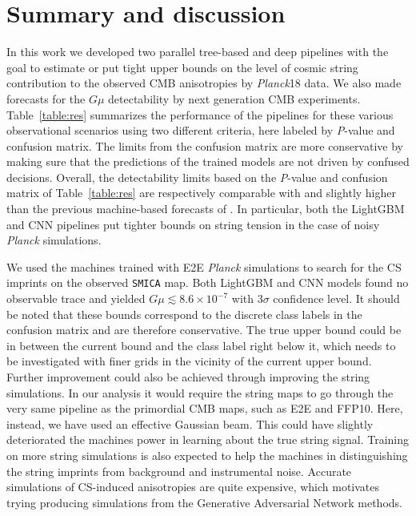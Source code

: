 \documentclass[fleqn,usenatbib]{mnras}
\begin{document}
 \section{Summary and discussion}\label{sec:sum}
In this work we developed two parallel tree-based and deep pipelines with the goal to estimate or put tight upper bounds on the level of cosmic string contribution
to the observed CMB anisotropies by {\it Planck}18 data. We also made forecasts for the $G\mu$ detectability by next generation CMB experiments.  
Table~\ref{table:res} summarizes the performance of the pipelines  for these various observational scenarios using two different criteria, here labeled by {\it P}-value and confusion matrix. 
The limits from the confusion matrix are more conservative by making sure that the predictions of the trained models are not driven  by confused decisions. 
Overall, the detectability limits based on the {\it P}-value and confusion matrix of Table~\ref{table:res} are respectively comparable with and slightly higher than the previous machine-based forecasts of \cite{vaf18}. In particular, both the LightGBM and CNN pipelines put tighter bounds on string tension in the case of noisy {\it Planck} simulations. 
%

We used the machines trained with E2E {\it Planck} simulations to search for the CS imprints on the observed \texttt{SMICA} map. Both LightGBM and CNN models found no observable trace  and yielded $G\mu \lesssim 8.6 \times 10^{-7}$  with $3\sigma$ confidence level.
It should be noted that these bounds correspond to the discrete class labels in the confusion matrix and are therefore conservative. The true upper bound could be in between the current bound and the class label right below it, which needs to be  investigated with finer grids in the vicinity of the current upper bound. 
Further improvement could also be achieved through improving the string simulations. In our analysis it would require the string maps to go  through the very same pipeline as the primordial CMB maps, such as E2E and FFP10. 
Here, instead, we have  used  an effective Gaussian beam.  This could have slightly deteriorated the machines power in learning about the true string signal.
Training on more string simulations is also expected to help the machines in distinguishing the string imprints from background and instrumental noise. Accurate simulations of CS-induced anisotropies are quite expensive, which motivates trying producing simulations from the Generative  Adversarial Network methods. 
\end{document}
